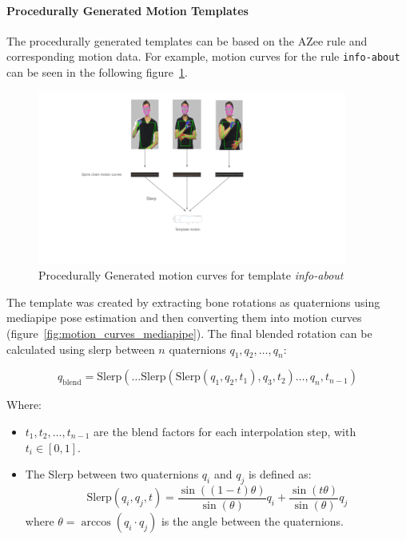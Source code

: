 \documentclass[../../main.tex]{subfiles}
\begin{document}
\paragraph{Procedurally Generated Motion Templates}
\label{ch:intermediate_blocks_pose_correction:creating_motion_templates:procedural}

The procedurally generated templates can be based on the AZee rule and corresponding motion data. For example, motion curves for the rule \texttt{info-about} can be seen in the following figure~\ref{fig:motion_curves_template_procedural}.

\begin{figure}
    \centering \includegraphics[width = 4in]{chapters/intermediate_blocks_pose_correction/images/motion_curves_template_procedural.png}
    \caption{Procedurally Generated motion curves for template \emph{info-about}}
    \label{fig:motion_curves_template_procedural}
\end{figure}

The template was created by extracting bone rotations as quaternions using mediapipe pose estimation and then converting them into motion curves (figure~\ref{fig:motion_curves_mediapipe}). The final blended rotation can be calculated using \gls{slerp} between \( n \) quaternions \( q_1, q_2, \dots, q_n \):

\[
q_{\text{blend}} = \text{Slerp}\left(\dots \text{Slerp}\left(\text{Slerp}(q_1, q_2, t_1), q_3, t_2 \right) \dots , q_n, t_{n-1} \right)
\]

Where:
\begin{itemize}
    \item \( t_1, t_2, \dots, t_{n-1} \) are the blend factors for each interpolation step, with \( t_i \in [0, 1] \).
    \item The Slerp between two quaternions \( q_i \) and \( q_j \) is defined as:
    \[
    \text{Slerp}(q_i, q_j, t) = \frac{\sin((1-t)\theta)}{\sin(\theta)} q_i + \frac{\sin(t\theta)}{\sin(\theta)} q_j
    \]
    where \( \theta = \arccos(q_i \cdot q_j) \) is the angle between the quaternions.
\end{itemize}
\end{document}
